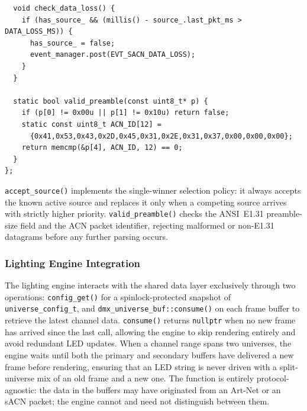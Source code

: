 \begin{longlisting}
\begin{verbatim}
  void check_data_loss() {
    if (has_source_ && (millis() - source_.last_pkt_ms > DATA_LOSS_MS)) {
      has_source_ = false;
      event_manager.post(EVT_SACN_DATA_LOSS);
    }
  }

  static bool valid_preamble(const uint8_t* p) {
    if (p[0] != 0x00u || p[1] != 0x10u) return false;
    static const uint8_t ACN_ID[12] =
      {0x41,0x53,0x43,0x2D,0x45,0x31,0x2E,0x31,0x37,0x00,0x00,0x00};
    return memcmp(&p[4], ACN_ID, 12) == 0;
  }
};
\end{verbatim}
\caption{\ac{sACN} receiver class.}
\label{lst:sacn_receiver}
\end{longlisting}

\texttt{accept\_source()} implements the single-winner selection policy: it always accepts the known active source and replaces it only when a competing source arrives with strictly higher priority.
\texttt{valid\_preamble()} checks the ANSI~E1.31 preamble-size field and the ACN packet identifier, rejecting malformed or non-E1.31 datagrams before any further parsing occurs.

\subsubsection{Lighting Engine Integration}
\label{sec:net_lighting_integration}

The lighting engine interacts with the shared data layer exclusively through two operations: \texttt{config\_get()} for a spinlock-protected snapshot of \texttt{universe\_config\_t}, and \texttt{dmx\_universe\_buf::consume()} on each frame buffer to retrieve the latest channel data.
\texttt{consume()} returns \texttt{nullptr} when no new frame has arrived since the last call, allowing the engine to skip rendering entirely and avoid redundant \ac{LED} updates.
When a channel range spans two universes, the engine waits until both the primary and secondary buffers have delivered a new frame before rendering, ensuring that an \ac{LED} string is never driven with a split-universe mix of an old frame and a new one.
The function is entirely protocol-agnostic: the data in the buffers may have originated from an Art-Net or an \ac{sACN} packet; the engine cannot and need not distinguish between them.

